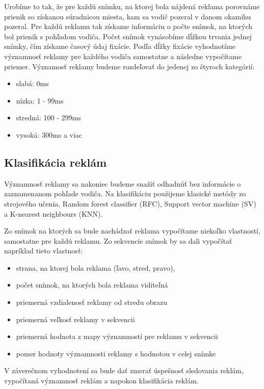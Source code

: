 Urobíme to tak, že pre každú snímku, na ktorej bola nájdená reklama porovnáme prienik so získanou súradnicou miesta, kam sa vodič pozeral v danom okamihu pozeral. Pre každú reklamu tak získame informáciu o počte snímok, na ktorých bol prienik s pohľadom vodiča. Počet snímok vynásobíme dĺžkou trvania jednej snímky, čím získame časový údaj fixácie. Podľa dĺžky fixácie vyhodnotíme významnosť reklamy pre každého vodiča samostatne a následne vypočítame priemer. Významosť reklamy budeme rozdeľovať do jedenej zo štyroch kategórií: 

\begin{itemize}
  \item slabá: 0ms
  \item nízka: 1 - 99ms
  \item stredná: 100 - 299ms
  \item vysoká: 300ms a viac 
\end{itemize}


\subsection{Klasifikácia reklám}

Významnosť reklamy sa nakoniec budeme snažiť odhadnúť bez informácie o zaznamenanom pohľade vodiča. Na klasifikáciu použijeme klasické metódy zo strojového učenia, Random forest classifier (RFC), Support vector machine (SV) a K-nearest neighbours (KNN). 

Zo snímok na ktorých sa bude nachádzať reklama vypočítame niekoľko vlastností, samostatne pre každú reklamu. Zo sekvencie snímok by sa dali vypočítať napríklad tieto vlastnosť:

\begin{itemize}
  \item strana, na ktorej bola reklama (ľavo, stred, pravo),
  \item počet snímok, na ktorých bola reklama viditeľná
  \item priemerná vzdialenosť reklamy od stredu obrazu
  \item priemerná veľkosť reklamy v sekvencii
  \item priemerná hodnota z mapy významností pre reklamu v sekvencii
  \item pomer hodnoty významnosti reklamy s hodnotou v celej snímke
\end{itemize}

V záverečnom vyhodnotení sa bude dať zmerať úspešnosť sledovania reklám, vypočítaná významnosť reklám a napokon klasifikácia reklám.


